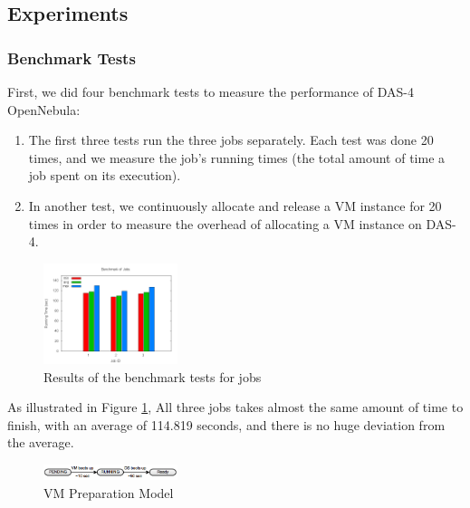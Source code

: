 \subsection{Experiments}

\subsubsection{Benchmark Tests}
First, we did four benchmark tests to measure the performance of DAS-4
OpenNebula:

\begin{enumerate}
\item The first three tests run the three jobs separately. Each
  test was done 20 times, and we measure the job's running times
  (the total amount of time a job spent on its execution).
\item In another test, we continuously allocate and release a VM
  instance for 20 times in order to measure the overhead of allocating
  a VM instance on DAS-4.
\end{enumerate}

\begin{figure}[!t]
\centering
\includegraphics[width=0.35\textwidth]{pictures/benchmark-jobs.png}
\caption{Results of the benchmark tests for jobs}
\label{figure_jobbenchmark}
\end{figure}

As illustrated in Figure \ref{figure_jobbenchmark}, All three jobs takes
almost the same amount of time to finish, with an average of 114.819 seconds, and there is no huge deviation from the average.

\begin{figure}
\centering
\includegraphics[width=0.35\textwidth]{pictures/vm-preparation-model.png}
\caption{VM Preparation Model}
\label{figure_vm_preparation_model}
\end{figure}

